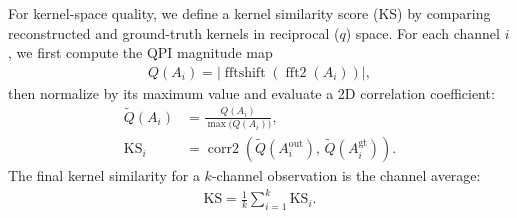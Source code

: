 For kernel-space quality, we define a kernel similarity score (KS) by comparing reconstructed and ground-truth kernels in reciprocal ($q$) space. For each channel $i$, we first compute the QPI magnitude map
\begin{align}
    Q\!\left(A_i\right)=\left|\operatorname{fftshift}\!\left(\operatorname{fft2}\!\left(A_i\right)\right)\right|,
\end{align}
then normalize by its maximum value and evaluate a 2D correlation coefficient:
\begin{align}
    \widetilde{Q}\!\left(A_i\right) &= \frac{Q\!\left(A_i\right)}{\max\!\big(Q\!\left(A_i\right)\big)},\\
    \mathrm{KS}_i &= \operatorname{corr2}\!\left(\widetilde{Q}\!\left(A_i^{\mathrm{out}}\right),\,\widetilde{Q}\!\left(A_i^{\mathrm{gt}}\right)\right).
\end{align}
The final kernel similarity for a $k$-channel observation is the channel average:
\begin{align}
    \mathrm{KS} = \frac{1}{k}\sum_{i=1}^{k}\mathrm{KS}_i.
\end{align}
